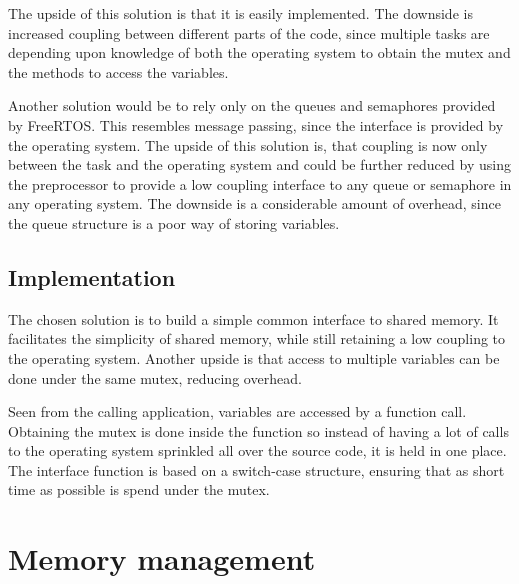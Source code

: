 The upside of this solution is that it is easily implemented. The downside is
increased coupling between different parts of the code, since multiple tasks are
depending upon knowledge of both the operating system to obtain the mutex and
the methods to access the variables.

Another solution would be to rely only on the queues and semaphores provided by
FreeRTOS. This resembles message passing, since the interface is provided by the
operating system. The upside of this solution is, that coupling is now only
between the task and the operating system and could be further reduced by using
the preprocessor to provide a low coupling interface to any queue or semaphore
in any operating system. The downside is a considerable amount of overhead,
since the queue structure is a poor way of storing variables.

\subsection{Implementation}
The chosen solution is to build a simple common interface to shared memory. It
facilitates the simplicity of shared memory, while still retaining a low
coupling to the operating system. Another upside is that access to multiple
variables can be done under the same mutex, reducing overhead.

Seen from the calling application, variables are accessed by a function call.
Obtaining the mutex is done inside the function so instead of having a lot of
calls to the operating system sprinkled all over the source code, it is held in
one place. The interface function is based on a switch-case structure, ensuring
that as short time as possible is spend under the mutex.


\section{Memory management}

